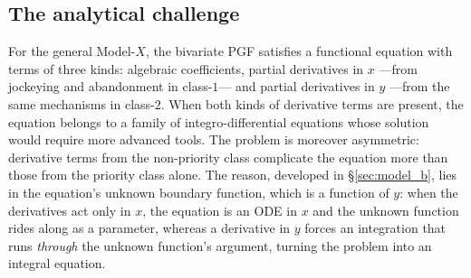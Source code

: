 \subsection*{The analytical challenge}

For the general Model-$X$, the bivariate PGF satisfies a functional equation with terms of three kinds: algebraic coefficients, partial derivatives in $x$ ---from jockeying and abandonment in class-$1$--- and partial derivatives in $y$ ---from the same mechanisms in class-$2$. When both kinds of derivative terms are present, the equation belongs to a family of integro-differential equations whose solution would require more advanced tools. The problem is moreover asymmetric: derivative terms from the non-priority class complicate the equation more than those from the priority class alone. The reason, developed in \S\ref{sec:model_b}, lies in the equation's unknown boundary function, which is a function of $y$: when the derivatives act only in $x$, the equation is an ODE in $x$ and the unknown function rides along as a parameter, whereas a derivative in $y$ forces an integration that runs \emph{through} the unknown function's argument, turning the problem into an integral equation.

